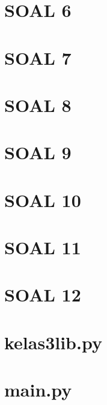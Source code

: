 \documentclass[12pt, times new roman]{report}
\begin{document}
\section*{SOAL 6}


\section*{SOAL 7}


\section*{SOAL 8}


\section*{SOAL 9}


\section*{SOAL 10}


\section*{SOAL 11}


\section*{SOAL 12}
\section*{kelas3lib.py}

\section*{main.py}

\end{document}
